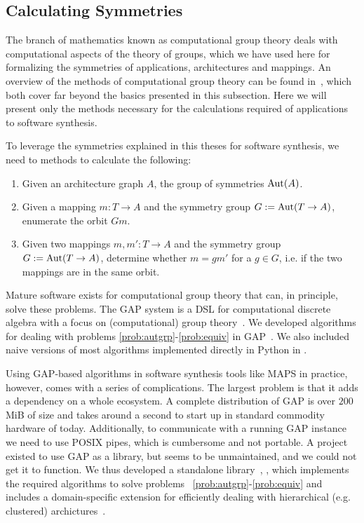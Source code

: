 \subsection{Calculating Symmetries}

The branch of mathematics known as computational group theory deals with computational aspects of the theory of groups, which we have used here for formalizing the symmetries of applications, architectures and mappings. 
An overview of the methods of computational group theory can be found in~\cite{holt,seress2003permutation}, which both cover far beyond the basics presented in this subsection.
Here we will present only the methods necessary for the calculations required of applications to software synthesis.

To leverage the symmetries explained in this theses for software synthesis, we need to methods to calculate the following:
\begin{enumerate}
\item\label{prob:autgrp} Given an architecture graph $A$, the group of symmetries $\operatorname{Aut}(A)$.
\item\label{prob:orbit} Given a mapping $m : T \rightarrow A$ and the symmetry group $G := \operatorname{Aut}(T \rightarrow A)$, enumerate the orbit $Gm$.
\item\label{prob:equiv} Given two mappings $m,m' : T \rightarrow A$ and the symmetry group $G := \operatorname{Aut}(T \rightarrow A)$, determine whether $m = gm'$ for a $g \in G$, i.e. if the two mappings are in the same orbit.
\end{enumerate}

Mature software exists for computational group theory that can, in principle, solve these problems. 
The \acs{GAP} system is a \ac{DSL} for computational discrete algebra with a focus on (computational) group theory~\cite{gap}.
We developed algorithms for dealing with problems \ref{prob:autgrp}-\ref{prob:equiv} in \ac{GAP}~\cite{goens_taco17}.
We also included naive versions of most algorithms implemented directly in Python in \mocasin.

Using \ac{GAP}-based algorithms in software synthesis tools like \ac{MAPS} in practice, however, comes with a series of complications.
The largest problem is that it adds a dependency on a whole ecosystem.
A complete distribution of \ac{GAP} is over $200$ MiB of size and takes around a second to start up in standard commodity hardware of today.
Additionally, to communicate with a running \ac{GAP} instance we need to use \ac{POSIX} pipes, which is cumbersome and not portable.
A project existed to use \ac{GAP} as a library, but seems to be unmaintained, and we could not get it to function.
We thus developed a standalone library~\cite{nicolai_studienarbeit}, \mpsym , which implements the required algorithms to solve problems ~\ref{prob:autgrp}-\ref{prob:equiv} and includes a domain-specific extension for efficiently dealing with hierarchical (e.g. clustered) archictures~\cite{goens_tcad21}.

